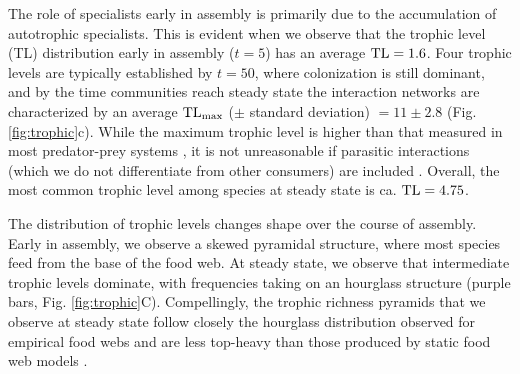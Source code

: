 \documentclass[twocolumn,preprintnumbers,amsmath,amssymb,superscriptaddress,linenumbers]{revtex4-1}
\begin{document}
The role of specialists early in assembly is primarily due to the accumulation of autotrophic specialists.
This is evident when we observe that the trophic level (TL) distribution early in assembly ($t=5$) has an average ${\rm TL}=1.6$.
Four trophic levels are typically established by $t=50$, where colonization is still dominant, and by the time communities reach steady state the interaction networks are characterized by an average ${\rm TL_{max}}$ ($\pm$ standard deviation) $=11 \pm 2.8$ (Fig. \ref{fig:trophic}c).
While the maximum trophic level is higher than that measured in most predator-prey systems \cite{Williams2002}, it is not unreasonable if parasitic interactions (which we do not differentiate from other consumers) are included \cite{Lafferty2006}.
Overall, the most common trophic level among species at steady state is ca. ${\rm TL}=4.75$. %

The distribution of trophic levels changes shape over the course of assembly.
Early in assembly, we observe a skewed pyramidal structure, where most species feed from the base of the food web.
At steady state, we observe that intermediate trophic levels dominate, with frequencies taking on an hourglass structure (purple bars, Fig. \ref{fig:trophic}C).
Compellingly, the trophic richness pyramids that we observe at steady state follow closely the hourglass distribution observed for empirical food webs and are less top-heavy than those produced by static food web models \cite{Turney2016}.\\







\end{document}
